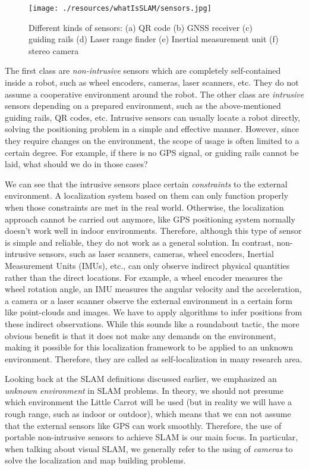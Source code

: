 \begin{figure}
	\centering
	\texttt{[image: ./resources/whatIsSLAM/sensors.jpg]}
	\caption{Different kinds of sensors: (a) QR code (b) GNSS receiver (c) guiding rails (d) Laser range finder (e) Inertial measurement unit (f) stereo camera }
	\label{fig:sensors}
\end{figure}

The first class are \emph{non-intrusive} sensors which are completely self-contained inside a robot, such as wheel encoders, cameras, laser scanners, etc. They do not assume a cooperative environment around the robot. The other class are \emph{intrusive} sensors depending on a prepared environment, such as the above-mentioned guiding rails, QR codes, etc. Intrusive sensors can usually locate a robot directly, solving the positioning problem in a simple and effective manner. However, since they require changes on the environment, the scope of usage is often limited to a certain degree. For example, if there is no GPS signal, or guiding rails cannot be laid, what should we do in those cases?

We can see that the intrusive sensors place certain \emph{constraints} to the external environment. A localization system based on them can only function properly when those constraints are met in the real world. Otherwise, the localization approach cannot be carried out anymore, like GPS positioning system normally doesn't work well in indoor environments. Therefore, although this type of sensor is simple and reliable, they do not work as a general solution. In contrast, non-intrusive sensors, such as laser scanners, cameras, wheel encoders, Inertial Measurement Units (IMUs), etc., can only observe indirect physical quantities rather than the direct locations. For example, a wheel encoder measures the wheel rotation angle, an IMU measures the angular velocity and the acceleration, a camera or a laser scanner observe the external environment in a certain form like point-clouds and images. We have to apply algorithms to infer positions from these indirect observations. While this sounds like a roundabout tactic, the more obvious benefit is that it does not make any demands on the environment, making it possible for this localization framework to be applied to an unknown environment. Therefore, they are called as self-localization in many research area.

Looking back at the SLAM definitions discussed earlier, we emphasized an \emph{unknown environment} in SLAM problems. In theory, we should not presume which environment the Little Carrot will be used (but in reality we will have a rough range, such as indoor or outdoor), which means that we can not assume that the external sensors like GPS can work smoothly. Therefore, the use of portable non-intrusive sensors to achieve SLAM is our main focus. In particular, when talking about visual SLAM, we generally refer to the using of \emph{cameras} to solve the localization and map building problems.

